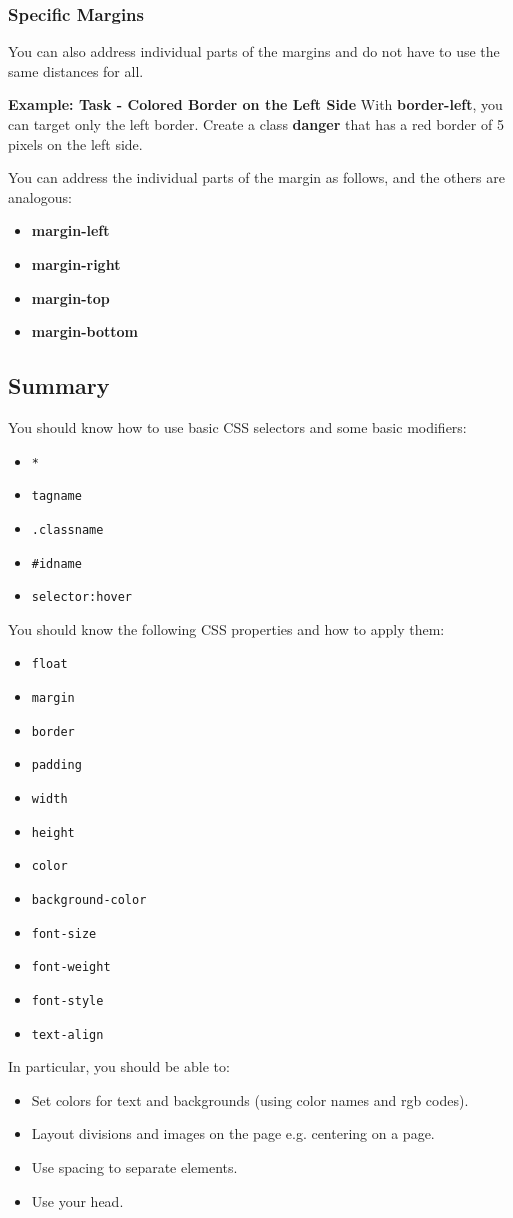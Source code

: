 \documentclass[english,11pt,a4paper]{report}
\begin{document}
\subsubsection{Specific Margins}
\begin{flushleft}
You can also address individual parts of the margins and do not have to use the same distances for all.
\end{flushleft}
\textbf{Example: Task - Colored Border on the Left Side}
With \textbf{border-left}, you can target only the left border. Create a class \textbf{danger} that has a red border of 5 pixels on the left side.
\begin{flushleft}
You can address the individual parts of the margin as follows, and the others are analogous:
\end{flushleft}
\begin{itemize}
    \item \textbf{margin-left}
    \item \textbf{margin-right}
    \item \textbf{margin-top}
    \item \textbf{margin-bottom}
\end{itemize}

\newpage

\subsection{Summary}

You should know how to use basic CSS selectors and some basic modifiers:
\begin{itemize}
  \item \verb|*|
  \item \verb|tagname|
  \item \verb|.classname|
  \item \verb|#idname|
  \item \verb|selector:hover|
\end{itemize}

You should know the following CSS properties and how to apply them:
\begin{itemize}
  \item \verb|float|
  \item \verb|margin|
  \item \verb|border|
  \item \verb|padding|
  \item \verb|width|
  \item \verb|height|
  \item \verb|color|
  \item \verb|background-color|
  \item \verb|font-size|
  \item \verb|font-weight|
  \item \verb|font-style|
  \item \verb|text-align|
\end{itemize}

In particular, you should be able to:
\begin{itemize}
  \item Set colors for text and backgrounds (using color names and rgb codes).
  \item Layout divisions and images on the page e.g. centering on a page.
  \item Use spacing to separate elements.
  \item Use your head.
\end{itemize}
\end{document}
